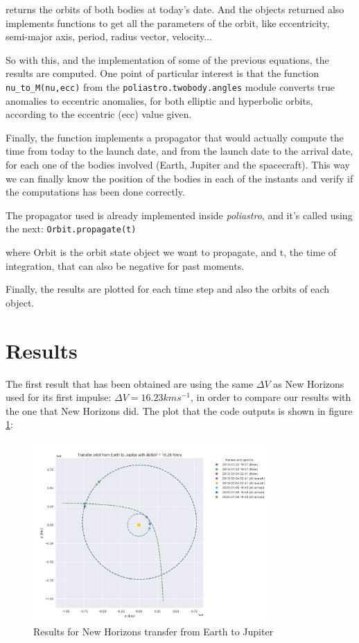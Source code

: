returns the orbits of both bodies at today's date.
And the objects returned also implements functions to get all the parameters of the
orbit, like eccentricity, semi-major axis, period, radius vector, velocity...

So with this, and the implementation of some of the previous equations, the results
are computed. One point of particular interest is that the function
\texttt{nu\_to\_M(nu,ecc)} from the \texttt{poliastro.twobody.angles} module converts
true anomalies to eccentric anomalies, for both elliptic and hyperbolic orbits,
according to the eccentric (ecc) value given.

Finally, the function implements a propagator that would actually compute the time
from today to the launch date, and from the launch date to the arrival date, for
each one of the bodies involved (Earth, Jupiter and the spacecraft). This way we
can finally know the position of the bodies in each of the instants and verify if
the computations has been done correctly.

The propagator used is already implemented inside \textit{poliastro}, and it's
called using the next:
\texttt{Orbit.propagate(t)}

where Orbit is the orbit state object we want to propagate, and t, the time of
integration, that can also be negative for past moments.

Finally, the results are plotted for each time step and also the orbits of each
object.

\section{Results}

The first result that has been obtained are using the same $\Delta V$ as New Horizons
used for its first impulse: $\Delta V = 16.23 km s^{-1}$, in order to compare our
results with the one that New Horizons did. The plot that the code outputs is shown
in figure \ref{fig:NH_transfer}:

\begin{figure}[h!]
	\centering
	\includegraphics[width=0.8\textwidth]{img/Transfer_New_Horizons_2019.png}
	\caption{Results for New Horizons transfer from Earth to Jupiter}
	\label{fig:NH_transfer}
\end{figure}

